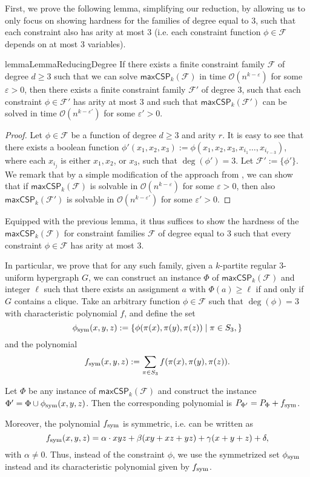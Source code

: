 \documentclass[a4paper,UKenglish,cleveref, autoref, thm-restate,numberwithinsect]{lipics-v2021}
\newcommand{\bigO}{\mathcal{O}}
\newcommand{\phisym}{\phi_{\rm sym}}
\newcommand{\fsym}{f_{\rm sym}}
\newcommand{\maxcspk}{\textsf{maxCSP}_{k}}
\newcommand{\Fam}{\mathcal{F}}
\begin{document}
First, we prove the following lemma, simplifying our reduction, by allowing us to only focus on showing hardness for the families of degree equal to $3$, such that each constraint also has arity at most $3$ (i.e. each constraint function $\phi \in \Fam$ depends on at most $3$ variables). 
\begin{restatable}{lemma}{LemmaReducingDegree}\label{lemma:reducing-degree}
    If there exists a finite constraint family $\Fam$ of degree $d \geq 3$ such that we can solve $\maxcspk(\Fam)$ in time $\bigO(n^{k-\varepsilon})$ for some $\varepsilon>0$, then there exists 
    a finite constraint family $\Fam'$ of degree $3$, such that each constraint $\phi\in \Fam'$ has arity at most $3$ and such that $\maxcspk(\Fam')$ can be solved in time $\bigO(n^{k-\varepsilon'})$ for some $\varepsilon'>0$.
\end{restatable}
\begin{proof}
    Let $\phi\in \Fam$ be a function of degree $d\geq 3$ and arity $r$.
    It is easy to see that there exists a boolean function $\phi'(x_1,x_2,x_3) := \phi(x_1,x_2,x_3,x_{i_1}\dots, x_{i_{r-3}})$, where each $x_{i_j}$ is either $x_1,x_2$, or $x_3$, such that $\deg(\phi')=3$.
    Let $\Fam':=\{\phi'\}$.
    We remark that by a simple modification of the approach from \cite{KunnemannM20}, we can show that if $\maxcspk(\Fam)$ is solvable in $\bigO(n^{k-\varepsilon})$ for some $\varepsilon>0$, then also $\maxcspk(\Fam')$ is solvable in $\bigO(n^{k-\varepsilon'})$ for some $\varepsilon'>0$.
\end{proof}

Equipped with the previous lemma, it thus suffices to show the hardness of the $\maxcspk(\Fam)$ for constraint families $\Fam$ of degree equal to $3$ such that every constraint $\phi\in \Fam$ has arity at most $3$.

In particular, we prove that for any such family, given a $k$-partite regular $3$-uniform hypergraph $G$, we can construct an instance $\Phi$ of $\maxcspk(\Fam)$ and integer $\ell$ such that there exists an assignment $a$ with $\Phi(a) \geq \ell$ if and only if $G$ contains a clique.
Take an arbitrary function $\phi\in \Fam$ such that $\deg(\phi) =3$ with characteristic polynomial $f$, and define the set \[\phi_{\rm sym}(x,y,z) := \{\phi(\pi(x), \pi(y), \pi(z))\mid \pi \in S_3,\}\] and the polynomial \[\fsym(x,y,z) := \sum_{\pi\in S_3}f(\pi(x), \pi(y),\pi(z)).\]
\begin{observation}\label{obs:sym-polynomial}
    Let $\Phi$ be any instance of $\maxcspk(\Fam)$ and construct the instance $\Phi' = \Phi \cup \phisym(x,y,z)$. 
    Then the corresponding polynomial is $P_{\Phi'} = P_\Phi + \fsym$.
\end{observation}
 Moreover, the polynomial $\fsym$ is symmetric, i.e. can be written as \begin{equation}\label{eq:fsym}
 \fsym(x,y,z) = \alpha \cdot xyz + \beta (xy+xz+yz) + \gamma(x+y+z) + \delta,   
 \end{equation} 
 with $\alpha\ne 0$.
 Thus, instead of the constraint $\phi$, we use the symmetrized set $\phi_{\rm sym}$ instead and its characteristic polynomial given by $\fsym$. 
\end{document}

